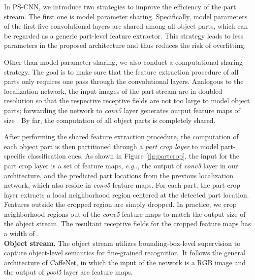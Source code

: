\documentclass[10pt,twocolumn,letterpaper]{article}
\makeatletter
\DeclareRobustCommand\onedot{\futurelet\@let@token\@onedot}
\def\@onedot{\ifx\@let@token.\else.\null\fi\xspace}
\def\eg{\emph{e.g}\onedot} \def\Eg{\emph{E.g}\onedot}
\makeatother
\begin{document}
In PS-CNN, we introduce two strategies to improve the efficiency of the part stream. The first one is model parameter sharing. Specifically, model parameters of the first five convolutional layers are shared among all object parts, which can be regarded as a generic part-level feature extractor. This strategy leads to less parameters in the proposed architecture and thus reduces the risk of overfitting.







Other than model parameter sharing, we also conduct a computational sharing strategy. The goal is to make sure that the feature extraction procedure of all parts only requires one pass through the convolutional layers. Analogous to the localization network, the input images of the part stream are in doubled resolution  so that the respective receptive fields are not too large to model object parts; forwarding the network to \textit{conv5} layer generates output feature maps of size . By far, the computation of all object parts is completely shared.



After performing the shared feature extraction procedure, the computation of each object part is then partitioned through a \emph{part crop layer} to model part-specific classification cues. As shown in Figure \ref{fig:partcrop}, the input for the part crop layer is a set of feature maps, \eg, the output of \textit{conv5} layer in our architecture, and the predicted part locations from the previous localization network, which also reside in \textit{conv5} feature maps. For each part, the part crop layer extracts a local neighborhood region centered at the detected part location. Features outside the cropped region are simply dropped. In practice, we crop  neighborhood regions out of the  \textit{conv5} feature maps to match the output size of the object stream. The resultant receptive fields for the cropped feature maps has a width of .\\









\noindent\textbf{Object stream.}
The object stream utilizes bounding-box-level supervision to capture object-level semantics for fine-grained recognition. It follows the general architecture of CaffeNet, in which the input of the network is a  RGB image and the output of \textit{pool5} layer are  feature maps.
\end{document}
